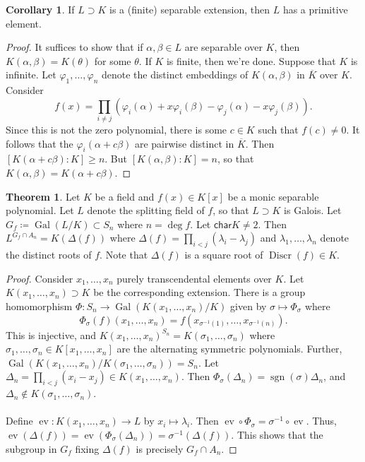 \documentclass[10pt,letterpaper,cm]{nupset}
\theoremstyle{definition}
\newtheorem{theorem}{Theorem}
\newtheorem{corollary}{Corollary}
\newcommand{\1}{\mathbf{1}}
\newcommand{\0}{\vec 0}
\newcommand{\Char}{\mathsf{char}}
\DeclareMathOperator{\gal}{Gal}
\DeclareMathOperator{\ev}{ev}
\DeclareMathOperator{\sgn}{sgn}
\DeclareMathOperator{\disc}{Discr}
\begin{document}
\begin{corollary}
If $L \supset K$ is a (finite) separable extension, then $L$ has a primitive element. 
\end{corollary}
\begin{proof}
It suffices to show that if $\alpha, \beta \in L$ are separable over $K$, then $K(\alpha, \beta) = K(\theta)$ for some $\theta$. If $K$ is finite, then we're done. Suppose that $K$ is infinite. Let $\varphi_1, \ldots, \varphi_n$ denote the distinct embeddings of $K(\alpha, \beta)$ in $\overline{K}$ over $K$. Consider $$ f(x) = \prod_{i \ne j} (\varphi_i(\alpha) + x \varphi_i(\beta) - \varphi_j(\alpha) - x \varphi_j(\beta))   .$$ Since this is not the zero polynomial, there is some $c\in K$ such that $f(c) \ne 0$. It follows that the $\varphi_i(\alpha + c \beta)$ are pairwise distinct in $\overline{K}$. Then $[K(\alpha + c \beta) : K] \geq n$. But $[K(\alpha, \beta) : K] = n$, so that $K(\alpha, \beta) = K(\alpha + c \beta)$. 
\end{proof}

\begin{theorem}
 Let $K$ be a field and $f(x) \in K[x]$ be a monic separable polynomial. Let $L$ denote the splitting field of $f$, so that $L \supset K$ is Galois. Let $G_f \coloneqq  \gal(L/K) \subset S_n$ where $n = \deg{f}$. Let $\Char{K} \ne 2$. Then $L^{G_f \cap A_n} = K(\Delta(f))$ where $\Delta(f) = \prod_{i < j}(\lambda_i - \lambda_j)$ and $\lambda_1, \ldots, \lambda_n$ denote the distinct roots of $f$. Note that $\Delta(f)$ is a square root of $\disc(f) \in K$. 
\end{theorem}
\begin{proof}
Consider $x_1, \ldots, x_n$ purely transcendental elements over $K$. Let $K(x_1, \ldots, x_n) \supset K$ be the corresponding extension. There is a group homomorphism $\Phi : S_n \to \gal(K(x_1, \ldots, x_n)/K)$ given by $\sigma \mapsto \Phi_{\sigma}$ where $$\Phi_{\sigma}(f)(x_1, \ldots, x_n) = f(x_{\sigma^{-1}(1)}, \ldots, x_{\sigma^{-1}(n)}).$$ This is injective, and $K(x_1, \ldots, x_n)^{S_n} = K(\sigma_1, \ldots, \sigma_n)$ where $\sigma_1, \ldots, \sigma_n \in K[x_1, \ldots, x_n]$ are the alternating symmetric polynomials. Further, $\gal(K(x_1, \ldots, x_n)/K(\sigma_1, \ldots, \sigma_n)) = S_n$. Let $\Delta_n = \prod_{i <j}(x_i - x_j) \in K(x_1, \ldots, x_n)$. Then $\Phi_{\sigma}(\Delta_n) = \sgn(\sigma)\Delta_n$, and $\Delta_n \notin K(\sigma_1, \ldots, \sigma_n)$. 
\\ \\ Define $\ev : K(x_1, \ldots, x_n) \to L$ by $x_i \mapsto \lambda_i$. Then $\ev \circ \Phi_{\sigma} = \sigma^{-1} \circ \ev$. Thus, $\ev(\Delta(f)) = \ev(\Phi_{\sigma}(\Delta_n)) = \sigma^{-1}(\Delta(f))$. This shows that the subgroup in $G_f$ fixing $\Delta(f)$ is precisely $G_f \cap A_n$. 
\end{proof}
\end{document}
